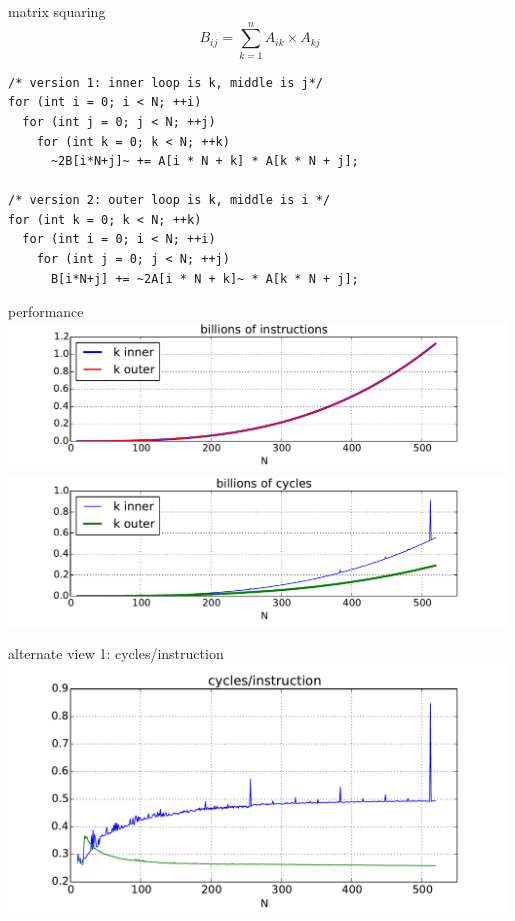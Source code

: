 \begin{frame}[fragile,label=matrixSquareTwoVersions]{matrix squaring}
\[ B_{ij} = \sum_{k=1}^n A_{ik}\times A_{kj} \]
\begin{lstlisting}
/* version 1: inner loop is k, middle is j*/
for (int i = 0; i < N; ++i)
  for (int j = 0; j < N; ++j)
    for (int k = 0; k < N; ++k)
      ~2B[i*N+j]~ += A[i * N + k] * A[k * N + j];

/* version 2: outer loop is k, middle is i */
for (int k = 0; k < N; ++k)
  for (int i = 0; i < N; ++i)
    for (int j = 0; j < N; ++j)
      B[i*N+j] += ~2A[i * N + k]~ * A[k * N + j];
\end{lstlisting}
\end{frame}

\begin{frame}{performance}
\includegraphics[width=0.99\textwidth]{../caching/k-inout-instrs} \\
\includegraphics[width=0.99\textwidth]{../caching/k-inout-cycles}
\end{frame}

\begin{frame}{alternate view 1: cycles/instruction}
\includegraphics[width=0.99\textwidth]{../caching/k-inout-cpi}
\end{frame}

